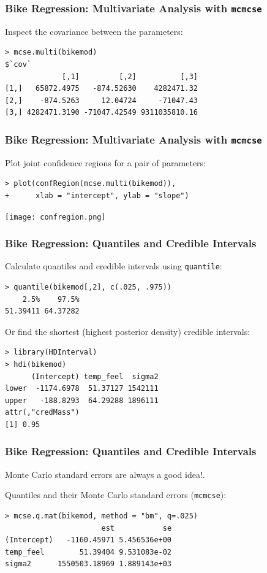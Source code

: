 \documentclass{beamer}
\begin{document}
\begin{frame}[fragile]
 \frametitle{ Bike Regression: Multivariate Analysis with \texttt{mcmcse}    }
Inspect the covariance between the parameters: 
\begin{verbatim}
> mcse.multi(bikemod)
$`cov`
             [,1]         [,2]          [,3]
[1,]   65872.4975   -874.52630    4282471.32
[2,]    -874.5263     12.04724     -71047.43
[3,] 4282471.3190 -71047.42549 9311035810.16
\end{verbatim}
\end{frame}


\begin{frame}[fragile]
 \frametitle{ Bike Regression: Multivariate Analysis with \texttt{mcmcse}    }
Plot joint confidence regions for a pair of parameters:
\begin{verbatim}
> plot(confRegion(mcse.multi(bikemod)),
+      xlab = "intercept", ylab = "slope") 
\end{verbatim}

\texttt{[image: confregion.png]}
\end{frame}

\begin{frame}[fragile]
 \frametitle{ Bike Regression: Quantiles and Credible Intervals    }
Calculate quantiles and credible intervals using \texttt{quantile}:
\begin{verbatim}
> quantile(bikemod[,2], c(.025, .975))
    2.5%    97.5% 
51.39411 64.37282 
\end{verbatim}
 
\pause
\vspace{.3cm}

Or find the shortest (highest posterior density) credible intervals:
\begin{verbatim}
> library(HDInterval)
> hdi(bikemod)
      (Intercept) temp_feel  sigma2
lower  -1174.6978  51.37127 1542111
upper   -188.8293  64.29288 1896111
attr(,"credMass")
[1] 0.95
\end{verbatim}
\end{frame}


\begin{frame}[fragile]
 \frametitle{ Bike Regression: Quantiles and Credible Intervals    }
Monte Carlo standard errors are always a good idea!.\\

\vspace{.4cm}
 
Quantiles and their Monte Carlo standard errors (\texttt{mcmcse}):
\begin{verbatim}
> mcse.q.mat(bikemod, method = "bm", q=.025) 
                      est           se
(Intercept)   -1160.45971 5.456536e+00
temp_feel        51.39404 9.531083e-02
sigma2      1550503.18969 1.889143e+03
\end{verbatim}
\end{frame}
\end{document}
